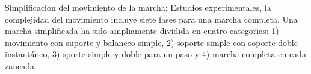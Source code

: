 \documentclass[10pt,onecolumn,twoside,letterpaper]{article}
\begin{document}
Simplificacion del movimiento de la marcha: Estudios experimentales, la complejidad del movimiento incluye siete fases para una marcha completa. Una marcha simplificada ha sido ampliamente dividida en cuatro categorias: 1) movimiento con suporte y balanceo simple, 2) soporte simple con soporte doble instant\'aneo, 3) sporte simple y doble para un paso y 4) marcha completa en cada zancada.\cite{Xiang2010}\\
\href{run:/home/jackmaster/Downloads/Doc Thesis/Walkers/+[2010 Y Xiang and J S  Arora and K Abdel-Malek] Art Physics-based modeling and simulation of human walking: a review of optimization -based and other approches.pdf}{
}\cite{Xiang2010}\\
\end{document}
